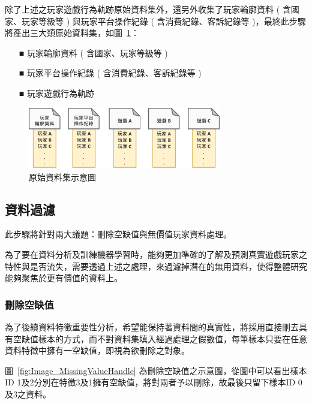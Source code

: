 除了上述之玩家遊戲行為軌跡原始資料集外，還另外收集了玩家輪廓資料 ( 含國家、玩家等級等 ) 與玩家平台操作紀錄 ( 含消費紀錄、客訴紀錄等 )，最終此步驟將產出三大類原始資料集，如圖~\ref{fig:Image_OriginalDatasets}：

\begin{itemize}
  \item[■] 玩家輪廓資料 ( 含國家、玩家等級等 )
  \item[■] 玩家平台操作紀錄 ( 含消費紀錄、客訴紀錄等 )
  \item[■] 玩家遊戲行為軌跡
\end{itemize} 

\begin{figure}[!htb]
  \begin{center}
    \includegraphics[width=0.75\textwidth]{figures/Image_OriginalDatasets.png}
    \caption[原始資料集示意圖]{原始資料集示意圖}
    \label{fig:Image_OriginalDatasets}
  \end{center}
\end{figure}
\newpage

\subsection{資料過濾}
\label{subsec:DataFilter}

此步驟將針對兩大議題：刪除空缺值與無價值玩家資料處理。

為了要在資料分析及訓練機器學習時，能夠更加準確的了解及預測真實遊戲玩家之特性與是否流失，需要透過上述之處理，來過濾掉潛在的無用資料，使得整體研究能夠聚焦於更有價值的資料上。

\subsubsection{刪除空缺值}
\label{subsubsec:MissingValueHandle}

為了後續資料特徵重要性分析，希望能保持著資料間的真實性，將採用直接刪去具有空缺值樣本的方式，而不對資料集填入經過處理之假數值，每筆樣本只要在任意資料特徵中擁有一空缺值，即視為欲刪除之對象。

圖~\ref{fig:Image_MissingValueHandle} 為刪除空缺值之示意圖，從圖中可以看出樣本ID 1及2分別在特徵3及1擁有空缺值，將對兩者予以刪除，故最後只留下樣本ID 0及3之資料。

